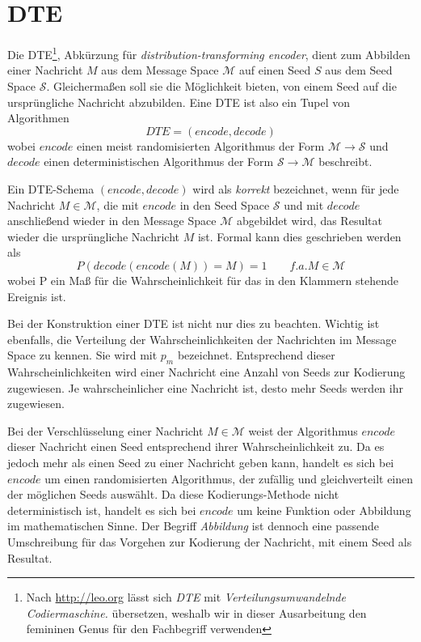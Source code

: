 \section{DTE}
\label{sec:dte}
Die DTE\footnote{Nach \url{http://leo.org} lässt sich \emph{DTE} mit \emph{Verteilungsumwandelnde Codiermaschine.} übersetzen, weshalb wir in dieser Ausarbeitung den femininen Genus für den Fachbegriff verwenden}, Abkürzung für \emph{distribution-transforming encoder}, dient zum Abbilden einer Nachricht $M$ aus dem Message Space $\mathcal{M}$ auf einen Seed $S$ aus dem Seed Space $\mathcal{S}$. Gleichermaßen soll sie die Möglichkeit bieten, von einem Seed auf die ursprüngliche Nachricht abzubilden. Eine DTE ist also ein Tupel von Algorithmen
$$DTE = (encode, decode)$$
wobei $encode$ einen meist randomisierten Algorithmus der Form $\mathcal{M} \rightarrow \mathcal{S}$ und $decode$ einen deterministischen Algorithmus der Form $\mathcal{S} \rightarrow \mathcal{M}$ beschreibt.

Ein DTE-Schema $(encode, decode)$ wird als \emph{korrekt} bezeichnet, wenn für jede Nachricht $M \in \mathcal{M}$, die mit $encode$ in den Seed Space $\mathcal{S}$ und mit $decode$ anschließend wieder in den Message Space $\mathcal{M}$ abgebildet wird, das Resultat wieder die ursprüngliche Nachricht $M$  ist. Formal kann dies geschrieben werden als
$$P(decode(encode(M)) = M) = 1 \qquad f.a. M \in \mathcal{M}$$
wobei P ein Maß für die Wahrscheinlichkeit für das in den Klammern stehende Ereignis ist.

Bei der Konstruktion einer DTE ist nicht nur dies zu beachten. Wichtig ist ebenfalls, die Verteilung der Wahrscheinlichkeiten der Nachrichten im Message Space zu kennen. Sie wird mit $p_m$ bezeichnet. Entsprechend dieser Wahrscheinlichkeiten wird einer Nachricht eine Anzahl von Seeds zur Kodierung zugewiesen. Je wahrscheinlicher eine Nachricht ist, desto mehr Seeds werden ihr zugewiesen.

Bei der Verschlüsselung einer Nachricht $M \in \mathcal{M}$ weist der Algorithmus $encode$ dieser Nachricht einen Seed entsprechend ihrer Wahrscheinlichkeit zu. Da es jedoch mehr als einen Seed zu einer Nachricht geben kann, handelt es sich bei $encode$ um einen randomisierten Algorithmus, der zufällig und gleichverteilt einen der möglichen Seeds auswählt. Da diese Kodierungs-Methode nicht deterministisch ist, handelt es sich bei $encode$ um keine Funktion oder Abbildung im mathematischen Sinne. Der Begriff \emph{Abbildung} ist dennoch eine passende Umschreibung für das Vorgehen zur Kodierung der Nachricht, mit einem Seed als Resultat.

